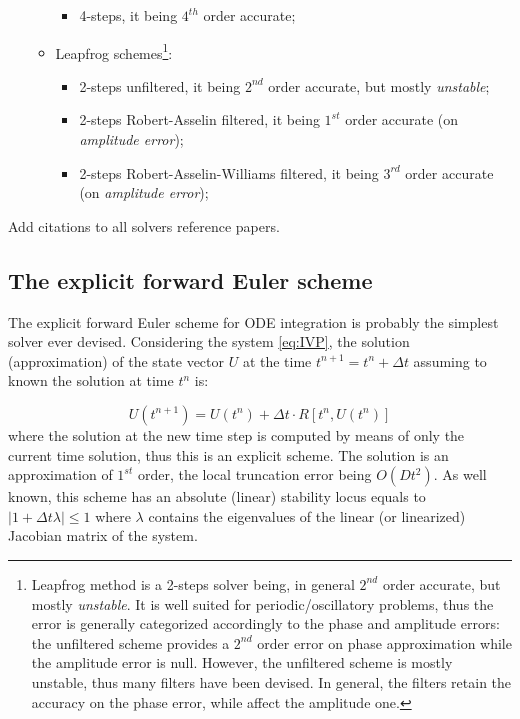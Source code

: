\documentclass[pdftex,preprint,3p,times,numbers]{elsarticle}
\begin{document}
\begin{itemize}
\begin{itemize}
\begin{itemize}
          \item 4-steps, it being $4^{th}$ order accurate;
          \end{itemize}
        \item Leapfrog schemes\footnote{Leapfrog method is a 2-steps solver being, in general $2^{nd}$ order accurate, but mostly \emph{unstable}. It is well suited for periodic/oscillatory problems, thus the error is generally categorized accordingly to the phase and amplitude errors: the unfiltered scheme provides a $2^{nd}$ order error on phase approximation while the amplitude error is null. However, the unfiltered scheme is mostly unstable, thus many filters have been devised. In general, the filters retain the accuracy on the phase error, while affect the amplitude one.}:
        \begin{itemize}
          \item 2-steps unfiltered, it being $2^{nd}$ order accurate, but mostly \emph{unstable};
          \item 2-steps Robert-Asselin filtered, it being $1^{st}$ order accurate (on \emph{amplitude error});
          \item 2-steps Robert-Asselin-Williams filtered, it being $3^{rd}$ order accurate (on \emph{amplitude error});
          \end{itemize}
      \end{itemize}
  \end{itemize}

{\color{red} Add citations to all solvers reference papers.}

\subsection{The explicit forward Euler scheme}

The explicit forward Euler scheme for ODE integration is probably the simplest solver ever devised. Considering the system \ref{eq:IVP}, the solution (approximation) of the state vector $U$ at the time $t^{n+1}=t^n+\Delta t$ assuming to known the solution at time $t^n$ is:

\begin{equation}
  U\left(t^{n+1}\right) = U\left(t^n\right) +\Delta t \cdot R\left[t^n, U\left(t^n\right)\right]
\label{eq:solver-euler}
\end{equation}
where the solution at the new time step is computed by means of only the current time solution, thus this is an explicit scheme. The solution is an approximation of $1^{st}$ order, the local truncation error being $O(Dt^2)$. As well known, this scheme has an absolute (linear) stability locus equals to $|1+\Delta t \lambda|\le 1$ where $\lambda$ contains the eigenvalues of the linear (or linearized) Jacobian matrix of the system.
\end{document}
